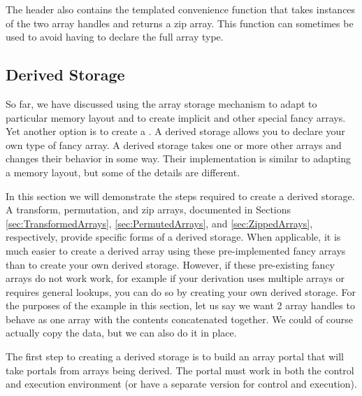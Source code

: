 The  header also contains the
templated convenience function  that takes
instances of the two array handles and returns a zip array. This function
can sometimes be used to avoid having to declare the full array type.



\subsection{Derived Storage}
\label{sec:DerivedStorage}


So far, we have discussed using the array storage mechanism to adapt to
particular memory layout and to create implicit and other special fancy
arrays. Yet another option is to create a . A
derived storage allows you to declare your own type of fancy array. A
derived storage takes one or more other arrays and changes their behavior
in some way. Their implementation is similar to adapting a memory layout,
but some of the details are different.

In this section we will demonstrate the steps required to create a derived
storage. A transform, permutation, and zip arrays, documented in Sections
\ref{sec:TransformedArrays}, \ref{sec:PermutedArrays}, and
\ref{sec:ZippedArrays}, respectively, provide specific forms of a derived
storage. When applicable, it is much easier to create a derived array using
these pre-implemented fancy arrays than to create your own derived storage.
However, if these pre-existing fancy arrays do not work work, for example
if your derivation uses multiple arrays or requires general lookups, you
can do so by creating your own derived storage. For the purposes of the
example in this section, let us say we want 2 array handles to behave as
one array with the contents concatenated together. We could of course
actually copy the data, but we can also do it in place.

The first step to creating a derived storage is to build an array portal
that will take portals from arrays being derived. The portal must work in
both the control and execution environment (or have a separate version for
control and execution).

